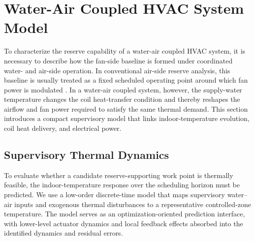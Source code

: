 \documentclass[journal]{IEEEtran}
\theoremstyle{remark}
\begin{document}
\section{Water-Air Coupled HVAC System Model}
\label{sec:system_modeling}
To characterize the reserve capability of a water-air coupled HVAC system, it is necessary to describe how the fan-side baseline is formed under coordinated water- and air-side operation. In conventional air-side reserve analysis, this baseline is usually treated as a fixed scheduled operating point around which fan power is modulated \cite{vrettos2015scheduling,liu2017evaluation,aslam2023optimal}. In a water-air coupled system, however, the supply-water temperature changes the coil heat-transfer condition and thereby reshapes the airflow and fan power required to satisfy the same thermal demand. This section introduces a compact supervisory model that links indoor-temperature evolution, coil heat delivery, and electrical power.
\subsection{Supervisory Thermal Dynamics}

To evaluate whether a candidate reserve-supporting work point is thermally feasible, the indoor-temperature response over the scheduling horizon must be predicted. We use a low-order discrete-time model that maps supervisory water--air inputs and exogenous thermal disturbances to a representative controlled-zone temperature. The model serves as an optimization-oriented prediction interface, with lower-level actuator dynamics and local feedback effects absorbed into the identified dynamics and residual errors.
\end{document}

